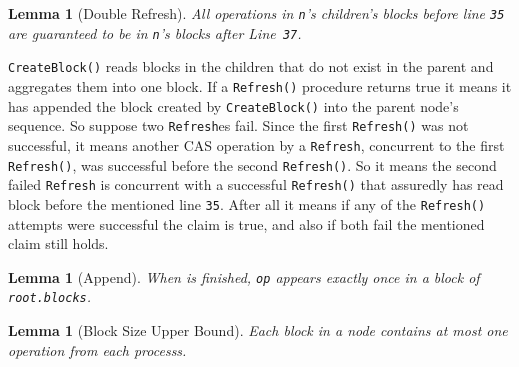 \documentclass[10pt]{article}
\renewcommand{\tt}[1]{\texttt{#1}}
\newtheorem{lemma}[theorem]{Lemma}
\theoremstyle{definition}
\begin{document}
\begin{lemma}[Double Refresh] \label{doublyRefresh}
All operations in \tt{n}'s children's blocks before line \tt{35} are guaranteed to be in \tt{n}'s blocks after Line~\tt{37}.
\end{lemma}
\tt{CreateBlock()} reads blocks in the children that do not exist in the parent and aggregates them into one block. If a \tt{Refresh()} procedure returns true it means it has appended the block created by \tt{CreateBlock()} into the parent node's sequence. So suppose two \tt{Refresh}es fail. Since the first \tt{Refresh()} was not successful, it means another CAS operation by a \tt{Refresh}, concurrent to the first \tt{Refresh()}, was successful before the second \tt{Refresh()}. So it means the second failed \tt{Refresh} is concurrent with a successful \tt{Refresh()} that assuredly has read block before the mentioned line \tt{35}. After all it means if any of the \tt{Refresh()} attempts were successful the claim is true, and also if both fail the mentioned claim still holds.

\begin{lemma}[Append]\label{append}
 When \text{\tt{Append(op)}} is finished, \tt{op} appears exactly once in a block of \tt{root.blocks}.
\end{lemma}

\begin{lemma}[Block Size Upper Bound]\label{blockSize}
Each block in a node contains at most one operation from each processs.  
\end{lemma}
\end{document}
